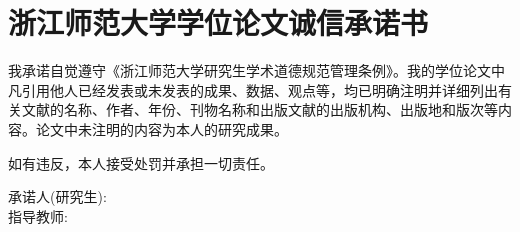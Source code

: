 
\chapter*{浙江师范大学学位论文诚信承诺书}

{\xiaosan\linespread{1.5}\selectfont
  我承诺自觉遵守《浙江师范大学研究生学术道德规范管理条例》。我的学位论文中凡引用他人已经发表或未发表的成果、数据、观点等，均已明确注明并详细列出有关文献的名称、作者、年份、刊物名称和出版文献的出版机构、出版地和版次等内容。论文中未注明的内容为本人的研究成果。

  如有违反，本人接受处罚并承担一切责任。      

  \vspace{20pt}
  \begin{flushright}
    承诺人(研究生): \phantom{\hspace{100pt}} \\[20pt]
    指导教师: \phantom{\hspace{100pt}}
  \end{flushright}
}




